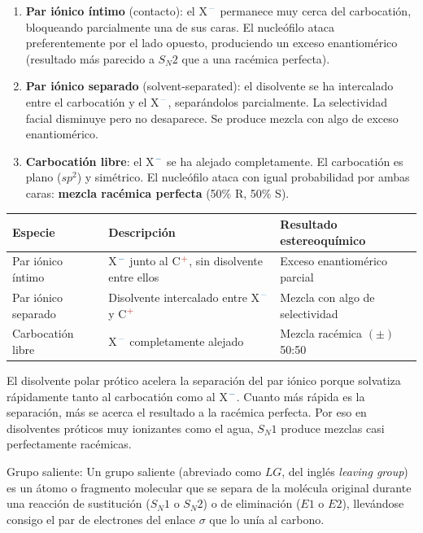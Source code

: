 \begin{enumerate}
\item \textbf{Par iónico íntimo} (contacto): el X$^{\color{anblue}-}$ permanece muy cerca del carbocatión,
    bloqueando parcialmente una de sus caras. El nucleófilo ataca preferentemente por el
    lado opuesto, produciendo un exceso enantiomérico (resultado más parecido a $S_N2$ 
    que a una racémica perfecta).

\item \textbf{Par iónico separado} (solvent-separated): el disolvente se ha intercalado
    entre el carbocatión y el X$^{\color{anblue}-}$, separándolos parcialmente. La selectividad facial
    disminuye pero no desaparece. Se produce mezcla con algo de exceso enantiomérico.

\item \textbf{Carbocatión libre}: el X$^{\color{anblue}-}$ se ha alejado completamente. El carbocatión
    es plano ($sp^2$) y simétrico. El nucleófilo ataca con igual probabilidad por ambas
    caras: \textbf{mezcla racémica perfecta} (50\% R, 50\% S).
\end{enumerate}

\begin{center}
\small
\begin{tabular}{|p{3cm}|p{3.5cm}|p{3.5cm}|}
\hline
\textbf{Especie} & \textbf{Descripción} & \textbf{Resultado estereoquímico} \\
\hline
Par iónico íntimo & X$^{\color{anblue}-}$ junto al C$^{\color{catred}+}$, sin disolvente entre ellos &
Exceso enantiomérico parcial \\
\hline
Par iónico separado & Disolvente intercalado entre X$^{\color{anblue}-}$ y C$^{\color{catred}+}$ &
Mezcla con algo de selectividad \\
\hline
Carbocatión libre & X$^{\color{anblue}-}$ completamente alejado & Mezcla racémica $(\pm)$ 50:50 \\
\hline
\end{tabular}
\normalsize
\end{center}

El disolvente polar prótico acelera la separación del par iónico porque solvatiza
rápidamente tanto al carbocatión como al X$^{\color{anblue}-}$. Cuanto más rápida es la separación,
más se acerca el resultado a la racémica perfecta. Por eso en disolventes próticos
muy ionizantes como el agua, $S_N1$ produce mezclas casi perfectamente racémicas.

Grupo saliente: Un grupo saliente (abreviado como $LG$, del inglés \textit{leaving group}) es un átomo
o fragmento molecular que se separa de la molécula original durante una reacción de sustitución
($S_N1$ o $S_N2$) o de eliminación ($E1$ o $E2$), llevándose consigo el par de electrones del enlace
$\sigma$ que lo unía al carbono.

